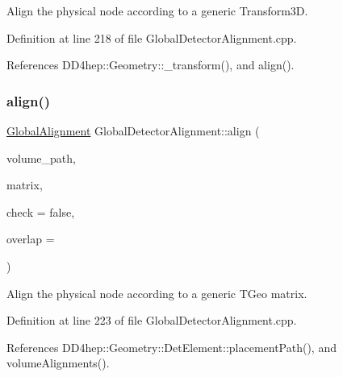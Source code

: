 Align the physical node according to a generic Transform3D. 



Definition at line 218 of file Global\+Detector\+Alignment.\+cpp.



References D\+D4hep\+::\+Geometry\+::\+\_\+transform(), and align().

\hypertarget{class_d_d4hep_1_1_alignments_1_1_global_detector_alignment_ae189ba965c23303f0b1f475a0629c164}{}\label{class_d_d4hep_1_1_alignments_1_1_global_detector_alignment_ae189ba965c23303f0b1f475a0629c164} 
\subsubsection{\texorpdfstring{align()}{align()}\hspace{0.1cm}{\footnotesize\ttfamily [10/10]}}
{\footnotesize\ttfamily \hyperlink{class_d_d4hep_1_1_alignments_1_1_global_alignment}{Global\+Alignment} Global\+Detector\+Alignment\+::align (\begin{DoxyParamCaption}\item[{const std\+::string \&}]{volume\+\_\+path,  }\item[{T\+Geo\+H\+Matrix $\ast$}]{matrix,  }\item[{bool}]{check = {\ttfamily false},  }\item[{double}]{overlap = {} }\end{DoxyParamCaption})}



Align the physical node according to a generic T\+Geo matrix. 



Definition at line 223 of file Global\+Detector\+Alignment.\+cpp.



References D\+D4hep\+::\+Geometry\+::\+Det\+Element\+::placement\+Path(), and volume\+Alignments().

\hypertarget{class_d_d4hep_1_1_alignments_1_1_global_detector_alignment_a3a5011151fd6fe30463d7ad7fdbcf9b1}{}\label{class_d_d4hep_1_1_alignments_1_1_global_detector_alignment_a3a5011151fd6fe30463d7ad7fdbcf9b1} 
